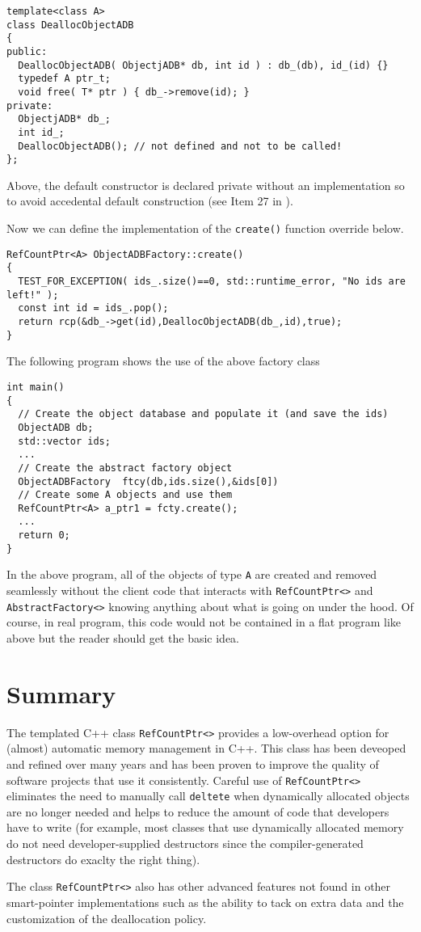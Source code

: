{\scriptsize\begin{verbatim}
template<class A>
class DeallocObjectADB
{
public:
  DeallocObjectADB( ObjectjADB* db, int id ) : db_(db), id_(id) {}
  typedef A ptr_t;
  void free( T* ptr ) { db_->remove(id); }
private:
  ObjectjADB* db_;
  int id_;
  DeallocObjectADB(); // not defined and not to be called!
};
\end{verbatim}}

{}\noindent{}Above, the default constructor is declared private
without an implementation so to avoid accedental default construction
(see Item 27 in {}\cite{ref:meyers_1994}).

Now we can define the implementation of the {}\texttt{create()} function
override below.

{\scriptsize\begin{verbatim}
RefCountPtr<A> ObjectADBFactory::create()
{
  TEST_FOR_EXCEPTION( ids_.size()==0, std::runtime_error, "No ids are left!" );
  const int id = ids_.pop();
  return rcp(&db_->get(id),DeallocObjectADB(db_,id),true);
}
\end{verbatim}}

The following program shows the use of the above factory class

{\scriptsize\begin{verbatim}
int main()
{
  // Create the object database and populate it (and save the ids)
  ObjectADB db;
  std::vector ids;
  ...
  // Create the abstract factory object
  ObjectADBFactory  ftcy(db,ids.size(),&ids[0])
  // Create some A objects and use them
  RefCountPtr<A> a_ptr1 = fcty.create();
  ...
  return 0;
}
\end{verbatim}}

In the above program, all of the objects of type {}\texttt{A} are
created and removed seamlessly without the client code that interacts
with {}\texttt{RefCountPtr<>} and {}\texttt{AbstractFactory<>} knowing
anything about what is going on under the hood.  Of course, in real
program, this code would not be contained in a flat program like above
but the reader should get the basic idea.

%
\section{Summary}
%

The templated C++ class {}\texttt{RefCountPtr<>} provides a
low-overhead option for (almost) automatic memory management in C++.
This class has been deveoped and refined over many years and has been
proven to improve the quality of software projects that use it
consistently.  Careful use of {}\texttt{RefCountPtr<>} eliminates the
need to manually call {}\texttt{deltete} when dynamically allocated
objects are no longer needed and helps to reduce the amount of code
that developers have to write (for example, most classes that use
dynamically allocated memory do not need developer-supplied
destructors since the compiler-generated destructors do exaclty the
right thing).

The class {}\texttt{RefCountPtr<>} also has other advanced features
not found in other smart-pointer implementations such as the ability
to tack on extra data and the customization of the deallocation
policy.
